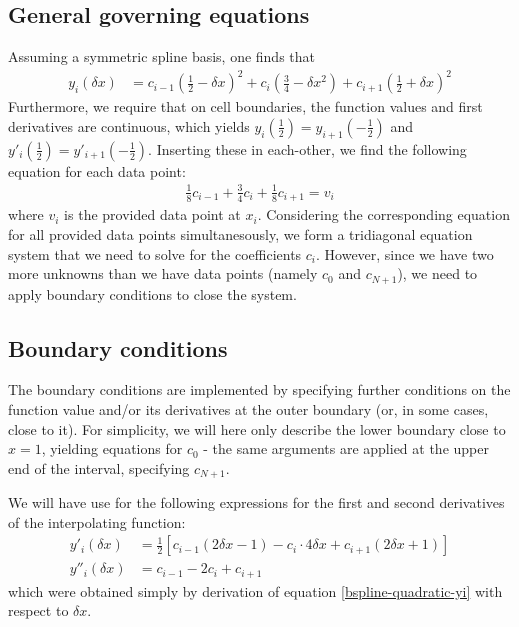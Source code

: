 \documentclass{article}
\begin{document}
\subsection{General governing equations}

Assuming a symmetric spline basis, one finds that
\begin{align}
\label{bspline-quadratic-yi}
y_i(\delta x) &= c_{i-1}\left(\tfrac{1}{2} - \delta x\right)^{2} + c_{i}\left(\tfrac{3}{4} - \delta x^{2}\right) + c_{i+1}\left(\tfrac{1}{2} + \delta x\right)^{2}
\end{align}
Furthermore, we require that on cell boundaries, the function values and first derivatives are continuous, which yields $y_{i}(\frac{1}{2}) = y_{i+1}(-\frac{1}{2})$ and $y'_{i}(\frac{1}{2}) = y'_{i+1}(-\frac{1}{2})$. Inserting these in each-other, we find the following equation for each data point:
\begin{align}
\label{bspline-quadratic-yi-ongrid}
\frac{1}{8} c_{i-1} + \frac{3}{4} c_{i} + \frac{1}{8} c_{i+1} = v_i
\end{align}
where $v_{i}$ is the provided data point at $x_{i}$. Considering the corresponding equation for all provided data points simultanesously, we form a tridiagonal equation system that we need to solve for the coefficients $c_{i}$. However, since we have two more unknowns than we have data points (namely $c_{0}$ and $c_{N+1}$), we need to apply boundary conditions to close the system.

\subsection{Boundary conditions}

The boundary conditions are implemented by specifying further conditions on the function value and/or its derivatives at the outer boundary (or, in some cases, close to it). For simplicity, we will here only describe the lower boundary close to $x = 1$, yielding equations for $c_0$ - the same arguments are applied at the upper end of the interval, specifying $c_{N+1}$.

We will have use for the following expressions for the first and second derivatives of the interpolating function:
\begin{align*}
y'_i(\delta x) &= \frac{1}{2}\left[c_{i-1}(2\delta x-1) - c_i \cdot 4\delta x + c_ {i+1} (2\delta x + 1)\right] \\
y''_i(\delta x) &= c_{i-1} - 2c_i + c_{i+1}
\end{align*}
which were obtained simply by derivation of equation \eqref{bspline-quadratic-yi} with respect to $\delta x$.
\end{document}
